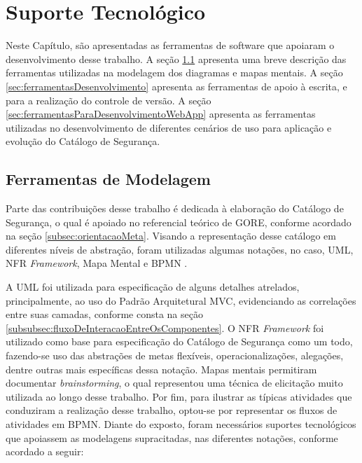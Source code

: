 \chapter{Suporte Tecnológico}
\label{chap:suporteTecnologico}

Neste Capítulo, são apresentadas as ferramentas de software que apoiaram o desenvolvimento desse trabalho. A seção \ref{sec:ferramentasModelagem} apresenta uma breve descrição das ferramentas utilizadas na modelagem dos diagramas e mapas mentais. A seção \ref{sec:ferramentasDesenvolvimento} apresenta as ferramentas de apoio à escrita, e para a realização do controle de versão. A seção \ref{sec:ferramentasParaDesenvolvimentoWebApp} apresenta as ferramentas utilizadas no desenvolvimento de diferentes cenários de uso para aplicação e evolução do Catálogo de Segurança.   

\section{Ferramentas de Modelagem}
\label{sec:ferramentasModelagem}

Parte das contribuições desse trabalho é dedicada à elaboração do Catálogo de Segurança, o qual é apoiado no referencial teórico de GORE, conforme acordado na seção \ref{subsec:orientacaoMeta}. Visando a representação desse catálogo em diferentes níveis de abstração, foram utilizadas algumas notações, no caso, UML, NFR \textit{Framework}, Mapa Mental \cite{xMind} e BPMN \cite{white2004introduction}.
 
A UML foi utilizada para especificação de alguns detalhes atrelados, principalmente, ao uso do Padrão Arquitetural MVC, evidenciando as correlações entre suas camadas, conforme consta na seção \ref{subsubsec:fluxoDeInteracaoEntreOsComponentes}. O NFR \textit{Framework} foi utilizado como base para especificação do Catálogo de Segurança como um todo, fazendo-se uso das abstrações de metas flexíveis, operacionalizações, alegações, dentre outras mais específicas dessa notação. Mapas mentais permitiram documentar \textit{brainstorming}, o qual representou uma técnica de elicitação muito utilizada ao longo desse trabalho. Por fim, para ilustrar as típicas atividades que conduziram a realização desse trabalho, optou-se por representar os fluxos de atividades em BPMN. Diante do exposto, foram necessários suportes tecnológicos que apoiassem as modelagens supracitadas, nas diferentes notações, conforme acordado a seguir:


